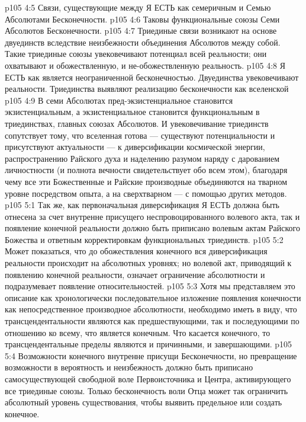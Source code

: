 \vs p105 4:5 \bibnobreakspace {} Связи, существующие между Я ЕСТЬ как семеричным и Семью Абсолютами Бесконечности.
\vs p105 4:6 \bibnobreakspace {} Таковы функциональные союзы Семи Абсолютов Бесконечности.
\vs p105 4:7 \pc Триединые связи возникают на основе двуединств вследствие неизбежности объединения Абсолютов между собой. Такие триединые союзы увековечивают потенциал всей реальности; они охватывают и обожествленную, и не\hyp{}обожествленную реальность.
\vs p105 4:8 Я ЕСТЬ как  является неограниченной бесконечностью. Двуединства увековечивают  реальности. Триединства выявляют реализацию бесконечности как вселенской 
\vs p105 4:9 В семи Абсолютах пред\hyp{}экзистенциальное становится экзистенциальным, а экзистенциальное становится функциональным в триединствах, главных союзах Абсолютов. И увековечивание триединств сопутствует тому, что вселенная готова --- существуют потенциальности и присутствуют актуальности --- к диверсификации космической энергии, распространению Райского духа и наделению разумом наряду с дарованием личностности (и полнота вечности свидетельствует обо всем этом), благодаря чему все эти Божественные и Райские производные объединяются на тварном уровне посредством опыта, а на сверхтварном --- с помощью других методов.
\vs p105 5:1 Так же, как первоначальная диверсификация Я ЕСТЬ должна быть отнесена за счет внутренне присущего неспровоцированного волевого акта, так и появление конечной реальности должно быть приписано волевым актам Райского Божества и ответным корректировкам функциональных триединств.
\vs p105 5:2 Может показаться, что до обожествления конечного вся диверсификация реальности происходит на абсолютных уровнях; но волевой акт, приводящий к появлению конечной реальности, означает ограничение абсолютности и подразумевает появление относительностей.
\vs p105 5:3 \pc Хотя мы представляем это описание как хронологически последовательное изложение появления конечности как непосредственное производное абсолютности, необходимо иметь в виду, что трансцендентальности являются как предшествующими, так и последующими по отношению ко всему, что является конечным. Что касается конечного, то трансцендентальные пределы являются и причинными, и завершающими.
\vs p105 5:4 \pc Возможности конечного внутренне присущи Бесконечности, но превращение возможности в вероятность и неизбежность должно быть приписано самосуществующей свободной воле Первоисточника и Центра, активирующего все триединые союзы. Только бесконечность воли Отца может так ограничить абсолютный уровень существования, чтобы выявить предельное или создать конечное.
